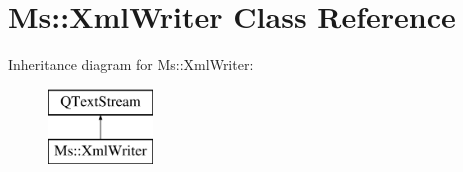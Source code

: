 \hypertarget{class_ms_1_1_xml_writer}{}\section{Ms\+:\+:Xml\+Writer Class Reference}
\label{class_ms_1_1_xml_writer}
Inheritance diagram for Ms\+:\+:Xml\+Writer\+:\begin{figure}[H]
\begin{center}
\leavevmode
\includegraphics[height=2.000000cm]{class_ms_1_1_xml_writer}
\end{center}
\end{figure}
